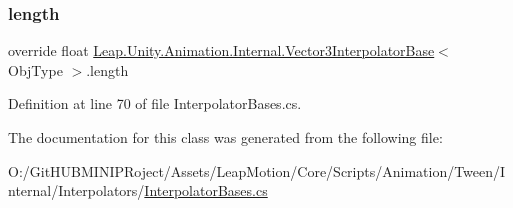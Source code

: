 \subsubsection{\texorpdfstring{length}{length}}
{\footnotesize\ttfamily override float \mbox{\hyperlink{class_leap_1_1_unity_1_1_animation_1_1_internal_1_1_vector3_interpolator_base}{Leap.\+Unity.\+Animation.\+Internal.\+Vector3\+Interpolator\+Base}}$<$ Obj\+Type $>$.length\hspace{0.3cm}{\ttfamily [get]}}



Definition at line 70 of file Interpolator\+Bases.\+cs.



The documentation for this class was generated from the following file\+:\begin{DoxyCompactItemize}
\item 
O\+:/\+Git\+H\+U\+B\+M\+I\+N\+I\+P\+Roject/\+Assets/\+Leap\+Motion/\+Core/\+Scripts/\+Animation/\+Tween/\+Internal/\+Interpolators/\mbox{\hyperlink{_interpolator_bases_8cs}{Interpolator\+Bases.\+cs}}\end{DoxyCompactItemize}
